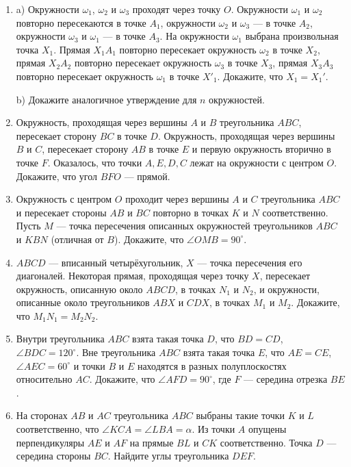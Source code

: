 \documentclass{article}
\begin{document}
\begin{enumerate}[label*=\protect\fbox{\arabic{enumi}}]
\item a) Окружности $\omega_1$, $\omega_2$ и $\omega_3$ проходят через точку $O$. Окружности $\omega_1$ и $\omega_2$ повторно пересекаются в точке $A_1$, окружности $\omega_2$ и $\omega_3$ — в точке $A_2$, окружности $\omega_3$ и $\omega_1$ — в точке $A_3$. На окружности $\omega_1$ выбрана произвольная точка $X_1$. Прямая $X_1A_1$ повторно пересекает окружность $\omega_2$ в точке $X_2$, прямая $X_2A_2$ повторно пересекает окружность $\omega_3$ в точке $X_3$, прямая $X_3A_3$ повторно пересекает окружность $\omega_1$ в точке $X'_1$. Докажите, что $X_1=X_1'$.

b) Докажите аналогичное утверждение для $n$ окружностей.

\item Окружность, проходящая через вершины $A$ и $B$ треугольника $ABC$, пересекает сторону $BC$ в точке $D$. Окружность, проходящая через вершины $B$ и $C$, пересекает сторону $AB$ в точке $E$ и первую окружность вторично в точке $F$. Оказалось, что точки $A, E, D, C$ лежат на окружности с центром $O$. Докажите, что угол $BFO$ — прямой.

\item Окружность с центром $O$ проходит через вершины $A$ и $C$ треугольника $ABC$ и пересекает стороны $AB$ и $BC$ повторно в точках $K$ и $N$ соответственно. Пусть $M$ — точка пересечения описанных окружностей треугольников $ABC$ и $KBN$ (отличная от $B$). Докажите, что $\angle OMB=90^\circ$.

\item $ABCD$  — вписанный четырёхугольник, $X$ — точка пересечения его диагоналей. Некоторая прямая, проходящая через точку $X$, пересекает окружность, описанную около $ABCD$, в точках $N_1$ и $N_2$, и окружности, описанные около треугольников $ABX$ и $CDX$, в точках $M_1$ и $M_2$. Докажите, что $M_1N_1=M_2N_2$.

\item Внутри треугольника $ABC$ взята такая точка $D$, что $BD=CD$, $\angle BDC=120^\circ$. Вне треугольника $ABC$ взята такая точка $E$, что $AE=CE$, $\angle AEC=60^\circ$ и точки $B$ и $E$ находятся в разных полуплоскостях относительно $AC$. Докажите, что $\angle AFD=90^\circ$, где $F$ — середина отрезка $BE$.

\item На сторонах $AB$ и $AC$ треугольника $ABC$ выбраны такие точки $K$ и $L$ соответственно, что $\angle KCA=\angle LBA=\alpha$. Из точки $A$ опущены перпендикуляры $AE$ и $AF$ на прямые $BL$ и $CK$ соответственно. Точка $D$ — середина стороны $BC$. Найдите углы треугольника $DEF$.


\end{enumerate}
\end{document}
